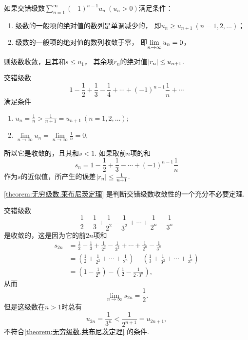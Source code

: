 \begin{theorem}[莱布尼茨定理]\label{theorem:无穷级数.莱布尼茨定理}
如果交错级数\(\sum\limits_{n=1}^\infty (-1)^{n-1} u_n\ (u_n>0)\)满足条件：
\begin{enumerate}
\item 级数的一般项的绝对值的数列是单调减少的，%
即\(u_n \geq u_{n+1}\ (n=1,2,\dotsc)\)；

\item 级数的一般项的绝对值的数列收敛于零，%
即\(\lim\limits_{n\to\infty} {u_n}=0\)，
\end{enumerate}
则级数收敛，且其和\(s \leq u_1\)，%
其余项\(r_n\)的绝对值\(\abs{r_n} \leq u_{n+1}\).
\end{theorem}

\begin{example}\label{example:无穷级数.交错级数1}
交错级数\[
1 - \frac{1}{2} + \frac{1}{3} - \frac{1}{4} + \dotsb + (-1)^{n-1} \frac{1}{n} + \dotsb
\]满足条件\begin{enumerate}
\item \(u_n = \frac{1}{n} > \frac{1}{n+1} = u_{n+1}\ (n=1,2,\dotsc)\);
\item \(\lim\limits_{n\to\infty} u_n = \lim\limits_{n\to\infty} \frac{1}{n} = 0\),
\end{enumerate}所以它是收敛的，且其和\(s < 1\).
如果取前\(n\)项的和\[
s_n = 1 - \frac{1}{2} + \frac{1}{3} - \dotsb + (-1)^{n-1} \frac{1}{n}
\]作为\(s\)的近似值，所产生的误差\(\abs{r_n} \leq \frac{1}{n+1}\).
\end{example}

\cref{theorem:无穷级数.莱布尼茨定理} 是判断交错级数收敛性的一个充分不必要定理.
\begin{example}
交错级数\[
\frac{1}{2} - \frac{1}{3}
+ \frac{1}{2^2} - \frac{1}{3^2}
+ \dotsm + \frac{1}{2^n} - \frac{1}{3^n}
\]是收敛的，这是因为它的前\(2n\)项和\begin{align*}
s_{2n} &= \frac{1}{2} - \frac{1}{3}
+ \frac{1}{2^2} - \frac{1}{3^2}
+ \dotsm + \frac{1}{2^n} - \frac{1}{3^n} \\
&= \left(\frac{1}{2} + \frac{1}{2^2} + \dotsm + \frac{1}{2^n}\right)
 - \left(\frac{1}{3} + \frac{1}{3^2} + \dotsm + \frac{1}{3^n}\right) \\
&= \left(1 - \frac{1}{2^n}\right)
 - \left(\frac{1}{2} - \frac{1}{2\cdot3^n}\right),
\end{align*}从而\[
\lim\limits_{n\to\infty} s_{2n} = \frac{1}{2}.
\]但是这级数在\(n>1\)时总有\[
u_{2n} = \frac{1}{3^n} < \frac{1}{2^{n+1}} = u_{2n+1},
\]不符合\cref{theorem:无穷级数.莱布尼茨定理} 的条件.
\end{example}

